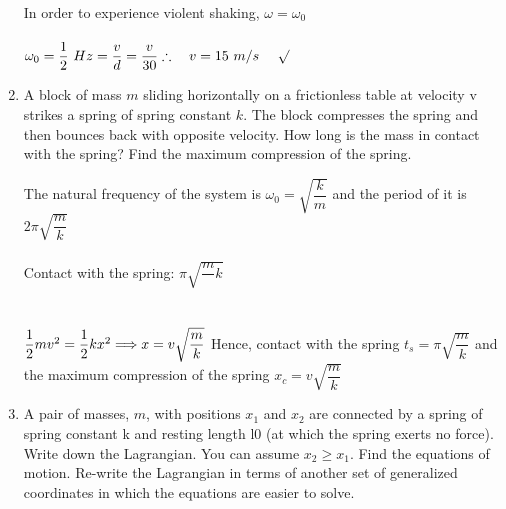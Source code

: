 \documentclass[fleqn]{article}
\begin{document}
\begin{enumerate}
      \textcolor{hwColor}{
        In order to experience violent shaking, $\omega=\omega_0$ \\
        \\
        $
          \omega_0=\dfrac{1}{2} ~ Hz=\dfrac{v}{d}=\dfrac{v}{30} \\
          \\
          \therefore ~~~ v=15 ~ m/s ~~~~ \surd
        $
      }


    \item A block of mass $m$ sliding horizontally on a frictionless table at velocity
    v strikes a spring of spring constant $k$. The block compresses the spring
    and then bounces back with opposite velocity. How long is the mass in
    contact with the spring? Find the maximum compression of the spring.

    \textcolor{hwColor}{
      The natural frequency of the system is $\omega_0=\sqrt{\dfrac{k}{m}}$ and the period of it is
      $2\pi \sqrt{\dfrac{m}{k}}$  \\
      \\
      Contact with the spring: $\pi\sqrt{\dfrac{m}{}k}$ \\
      \\
      \\
      $
        \dfrac{1}{2}mv^2=\dfrac{1}{2}kx^2 \Longrightarrow x=v\sqrt{\dfrac{m}{k}} \\ \\
      $
      Hence, contact with the spring $t_s=\pi\sqrt{\dfrac{m}{k}}$ and the maximum compression of the spring $x_c=v\sqrt{\dfrac{m}{k}}$ 
    }


    \item A pair of masses, $m$, with positions $x_1$ and $x_2$ are connected by a spring
    of spring constant k and resting length l0 (at which the spring exerts no
    force). Write down the Lagrangian. You can assume $x_2 ≥ x_1$. Find the
    equations of motion. Re-write the Lagrangian in terms of another set
    of generalized coordinates in which the equations are easier to solve.


\end{enumerate}
\end{document}
